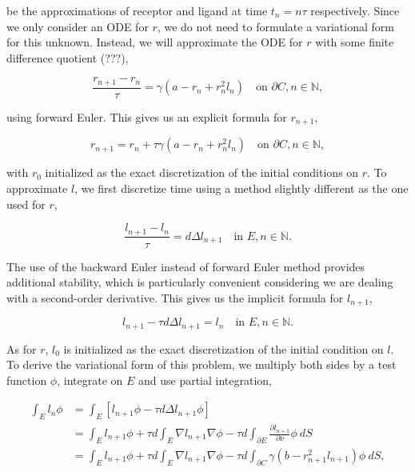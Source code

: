 \noindent
be the approximations of receptor and ligand at time $t_n = n\tau$ respectively. Since we only consider an ODE for $r$, we do not need to formulate a variational form for this unknown. Instead, we will approximate the ODE for $r$ with some finite difference quotient (???),

\begin{equation}
        \frac{r_{n + 1} - r_{n}}{\tau} = \gamma (a - r_{n} + r_{n}^{2}l_{n}) \quad \text{on } \partial C, n \in \mathbb{N},
\end{equation}

\noindent
using forward Euler. This gives us an explicit formula for $r_{n + 1}$,

\begin{equation}
        r_{n + 1} = r_{n} + \tau \gamma \left( a - r_{n} + r_{n}^{2}l_{n} \right) \quad \text{on } \partial C, n \in \mathbb{N},
\end{equation}

\noindent
with $r_{0}$ initialized as the exact discretization of the initial conditions on $r$. To approximate $l$, we first discretize time using a method slightly different as the one used for $r$,

\begin{equation}
        \frac{l_{n + 1} - l_{n}}{\tau} = d \Delta l_{n + 1} \quad \text{in } E, n \in \mathbb{N}.
\end{equation}

\noindent
The use of the backward Euler instead of forward Euler method provides additional stability, which is particularly convenient considering we are dealing with a second-order derivative. This gives us the implicit formula for $l_{n + 1}$,

\begin{equation}
        l_{n + 1} - \tau d \Delta l_{n + 1} = l_{n} \quad \text{in } E, n \in \mathbb{N}.
\end{equation}

\noindent
As for $r$, $l_{0}$ is initialized as the exact discretization of the initial condition on $l$. To derive the variational form of this problem, we multiply both sides by a test function $\phi$, integrate on $E$ and use partial integration,

\begin{equation}
    \begin{aligned}
        \int_{E} l_n \phi &= \int_{E} \left[ l_{n + 1} \phi - \tau d \Delta l_{n + 1} \phi \right] \\
        &= \int_{E} l_{n + 1} \phi + \tau d \int_{E} \nabla l_{n + 1} \nabla \phi - \tau d \int_{\partial E} \frac{\partial l_{n + 1}}{\partial \nu} \phi\ dS \\
        &= \int_{E} l_{n + 1} \phi + \tau d \int_{E} \nabla l_{n + 1} \nabla \phi - \tau d \int_{\partial C} \gamma (b - r_{n + 1}^{2}l_{n + 1}) \phi\ dS, \\
    \end{aligned}
\end{equation}

